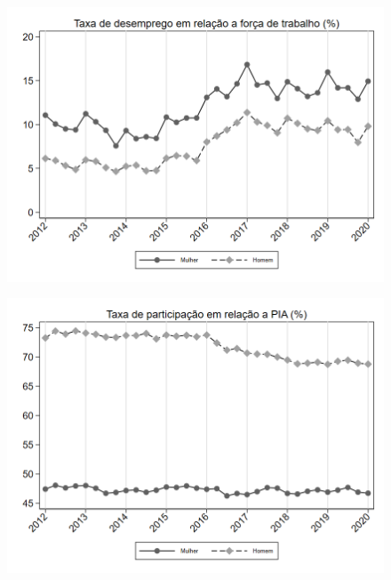 \begin{frame}[label=_composicao_demografica_genero_taxa_de_desemprego]{}
\textit{\hyperlink{_composicao_demografica_genero}{}}
\begin{figure}
  \centering
  \includegraphics[width=1.0\linewidth]{../../analysis/output/composicao_demografica/genero/_composicao_demografica_genero_taxa_de_desemprego.png}
  \caption{}
  \label{fig:_composicao_demografica_genero_taxa_de_desemprego}
\end{figure}
\end{frame}

\begin{frame}[label=_composicao_demografica_genero_taxa_de_participacao]{}
\textit{\hyperlink{_composicao_demografica_genero}{}}
\begin{figure}
  \centering
  \includegraphics[width=1.0\linewidth]{../../analysis/output/composicao_demografica/genero/_composicao_demografica_genero_taxa_de_participacao.png}
  \caption{}
  \label{fig:_composicao_demografica_genero_taxa_de_participacao}
\end{figure}
\end{frame}


